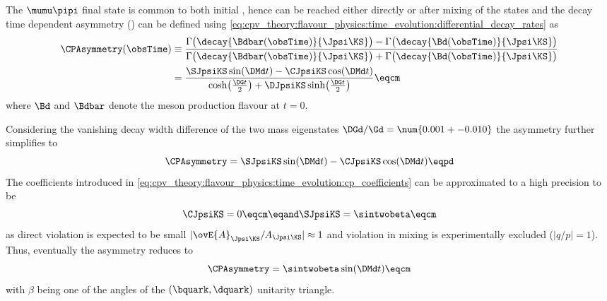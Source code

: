 The $\mumu\pipi$ final state is common to both initial \Bmesons, hence can be
reached either directly or after mixing of the \Bmeson states and the decay time
dependent \CP asymmetry \CPAsymmetry(\obsTime) can be defined using
\cref{eq:cpv_theory:flavour_physics:time_evolution:differential_decay_rates} as
%
\begin{equation}\label{eq:cpv_theory:bd2jpsiks:cp_asymmetry}
  \begin{split}
    \CPAsymmetry(\obsTime) &\equiv 
      \frac{\Gamma\bigl(\decay{\Bdbar(\obsTime)}{\Jpsi\KS}\bigr) - \Gamma\bigl(\decay{\Bd(\obsTime)}{\Jpsi\KS}\bigr)}
           {\Gamma\bigl(\decay{\Bdbar(\obsTime)}{\Jpsi\KS}\bigr) + \Gamma\bigl(\decay{\Bd(\obsTime)}{\Jpsi\KS}\bigr)} \\
                 &= \frac{\SJpsiKS\sin(\DMd t) - \CJpsiKS\cos(\DMd t)}{\cosh\bigl(\frac{\DG t}{2}\bigr) + \DJpsiKS\sinh\bigl(\frac{\DG t}{2}\bigr)} \eqcm
  \end{split}
\end{equation}
%
where $\Bd$ and $\Bdbar$ denote the meson production flavour at $t=0$.

Considering the vanishing decay width difference of the two mass eigenstates
$\DGd/\Gd = \num{0.001 +- 0.010}$ \cite{Amhis:2014hma} the \CP asymmetry further
simplifies to
%
\begin{equation}
  \CPAsymmetry = \SJpsiKS\sin(\DMd t) - \CJpsiKS\cos(\DMd t) \eqpd
\end{equation}
%
The \CP coefficients introduced in
\cref{eq:cpv_theory:flavour_physics:time_evolution:cp_coefficients} can be
approximated to a high precision to be
%
\begin{equation}
  \CJpsiKS = 0           \eqcm\eqand 
  \SJpsiKS = \sintwobeta \eqcm
\end{equation}
%
as direct \CP violation is expected to be small
$\vert\ovE{A}_{\Jpsi\KS}/A_{\Jpsi\KS}\vert\approx 1$ and \CP violation in mixing
is experimentally excluded ($\vert q/p \vert = 1$). Thus, eventually the \CP
asymmetry reduces to
%
\begin{equation}
  \CPAsymmetry = \sintwobeta\sin(\DMd t) \eqcm
\end{equation}
%
with $\beta$ being one of the angles of the ${(\bquark,\dquark)}$ unitarity
triangle.

